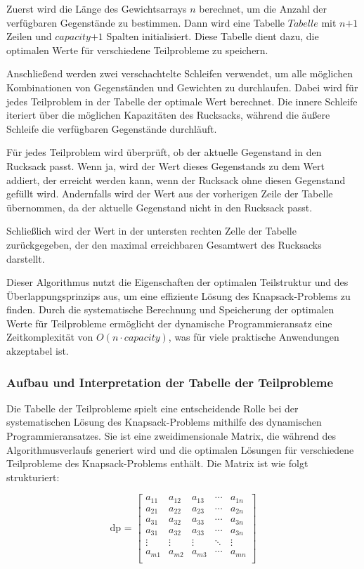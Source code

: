 Zuerst wird die Länge des Gewichtsarrays \( \textit{n} \) berechnet, um die Anzahl der verfügbaren Gegenstände zu bestimmen.
Dann wird eine Tabelle \( \textit{Tabelle} \) mit \( \textit{n+1} \) Zeilen und \( \textit{capacity+1} \) Spalten initialisiert.
Diese Tabelle dient dazu, die optimalen Werte für verschiedene Teilprobleme zu speichern.

Anschließend werden zwei verschachtelte Schleifen verwendet, um alle möglichen Kombinationen von Gegenständen und Gewichten
zu durchlaufen. Dabei wird für jedes Teilproblem in der Tabelle der optimale Wert berechnet. Die innere Schleife iteriert
über die möglichen Kapazitäten des Rucksacks, während die äußere Schleife die verfügbaren Gegenstände durchläuft.

Für jedes Teilproblem wird überprüft, ob der aktuelle Gegenstand in den Rucksack passt. Wenn ja, wird der Wert dieses
Gegenstands zu dem Wert addiert, der erreicht werden kann, wenn der Rucksack ohne diesen Gegenstand gefüllt wird. Andernfalls
wird der Wert aus der vorherigen Zeile der Tabelle übernommen, da der aktuelle Gegenstand nicht in den Rucksack passt.

Schließlich wird der Wert in der untersten rechten Zelle der Tabelle zurückgegeben, der den maximal erreichbaren Gesamtwert
des Rucksacks darstellt.

Dieser Algorithmus nutzt die Eigenschaften der optimalen Teilstruktur und des Überlappungsprinzips aus, um eine effiziente
Lösung des Knapsack-Problems zu finden. Durch die systematische Berechnung und Speicherung der optimalen Werte für Teilprobleme
ermöglicht der dynamische Programmieransatz eine Zeitkomplexität von \( O(n \cdot capacity) \), was für viele praktische
Anwendungen akzeptabel ist.

\subsubsection*{Aufbau und Interpretation der Tabelle der Teilprobleme}
Die Tabelle der Teilprobleme spielt eine entscheidende Rolle bei der systematischen Lösung des Knapsack-Problems mithilfe
des dynamischen Programmieransatzes. Sie ist eine zweidimensionale Matrix, die während des Algorithmusverlaufs generiert
wird und die optimalen Lösungen für verschiedene Teilprobleme des Knapsack-Problems enthält. Die Matrix ist wie folgt strukturiert:

\[
\text{dp = }
\left[
\begin{array}{ccccc}
a_{11} & a_{12} & a_{13} & \cdots & a_{1n} \\
a_{21} & a_{22} & a_{23} & \cdots & a_{2n} \\
a_{31} & a_{32} & a_{33} & \cdots & a_{3n} \\
a_{31} & a_{32} & a_{33} & \cdots & a_{3n} \\
\vdots & \vdots & \vdots & \ddots & \vdots \\
a_{m1} & a_{m2} & a_{m3} & \cdots & a_{mn} \\
\end{array}
\right]
\]

